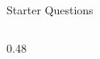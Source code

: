 \documentclass[aspectratio=169,11pt]{beamer}
\begin{document}
\begin{frame}{Starter Questions}
\begin{columns}[t]
\begin{column}{0.48\textwidth}
\end{column}
\end{columns}

\end{frame}
\end{document}
